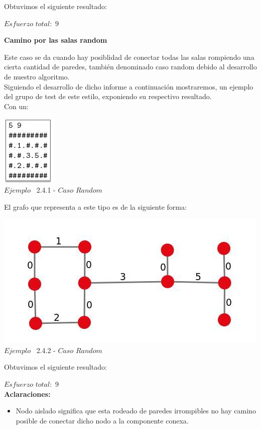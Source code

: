   Obtuvimos el siguiente resultado:

$Esfuerzo$ $total: $ $9$


\begin{center}
 \textbf{Camino por las salas random}
\end{center}

Este caso se da cuando hay posiblidad de conectar todas las salas rompiendo una cierta cantidad de paredes, tambi\'en denominado caso random debido al desarrollo de nuestro algoritmo.\\

Siguiendo el desarrollo de dicho informe a continuaci\'on mostraremos, un ejemplo del grupo de test de este estilo, exponiendo su respectivo resultado.\\
 
 Con un:
 
\vspace*{0.3cm} \vspace*{0.3cm}
  \begin{center}
 \includegraphics[scale=0.65]{./EJ2/ej2random.jpeg}
\\ {$Ejemplo$ \ 2.4.1 - $Caso$ $Random$}
  \end{center}
  \vspace*{0.3cm}

El grafo que representa a este tipo es de la siguiente forma:\\

\vspace*{0.3cm} \vspace*{0.3cm}
  \begin{center}
 \includegraphics[scale=0.5]{./EJ2/ej2graforandom.jpeg}
 \\{$Ejemplo$ \ 2.4.2 - $Caso$ $Random$}
  \end{center}
  \vspace*{0.3cm}

  Obtuvimos el siguiente resultado:

$Esfuerzo$ $total: $ $9$\\


\textbf{Aclaraciones:} 
\begin{itemize}
\item Nodo aislado significa que esta rodeado de paredes irrompibles no hay camino posible de conectar dicho nodo a la componente conexa.
\end{itemize}